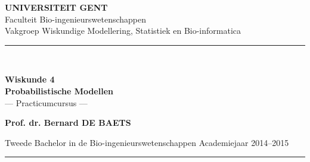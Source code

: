 \begin{titlepage}
	\begin{center}
		{\Large\bf UNIVERSITEIT GENT}\\[.5cm]
		{\Large Faculteit Bio-ingenieurswetenschappen}\\[.5cm]
		{\Large Vakgroep Wiskundige Modellering, Statistiek en Bio-informatica}\\[.5cm]
		\hrule{\ }\\[.4cm]
	
		\vspace{4cm}
\begin{mdframed}[style=warning]
		\vspace{1cm}
\centering
		{{\Huge \bf Wiskunde 4\\[.5cm] Probabilistische Modellen}}\\[1cm]
		{\LARGE --- Practicumcursus ---}
		\vspace{1cm}
\end{mdframed}
		\vspace{3cm}


	\end{center}
	
	\begin{center}
		{\large \bf Prof. dr. Bernard DE BAETS\\[.5cm]
		}%
		
		\vfill
		Tweede Bachelor in de Bio-ingenieurswetenschappen\hfill
		Academiejaar 2014--2015\\[.3cm]
		\hrule \vspace{.3cm}
	\end{center}
\end{titlepage}